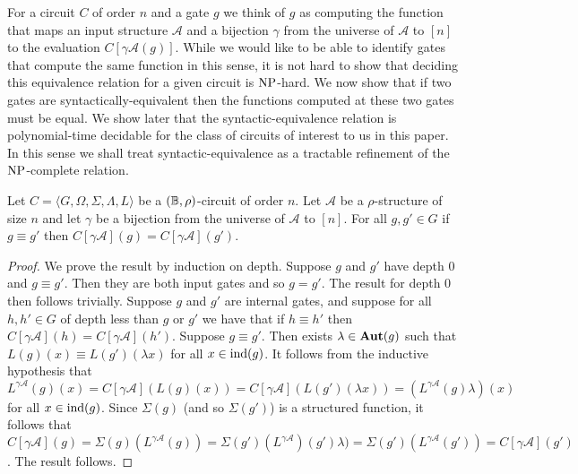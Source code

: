 \documentclass[../paper.tex]{subfiles}
\begin{document}

For a circuit $C$ of order $n$ and a gate $g$ we think of $g$ as computing the
function that maps an input structure $\mathcal{A}$ and a bijection $\gamma$
from the universe of $\mathcal{A}$ to $[n]$ to the evaluation $C[\gamma
\mathcal{A}(g)]$. While we would like to be able to identify gates that compute
the same function in this sense, it is not hard to show that deciding this
equivalence relation for a given circuit is $\mathrm{NP}$-hard. We now show that if two
gates are syntactically-equivalent then the functions computed at these two
gates must be equal. We show later that the syntactic-equivalence relation is
polynomial-time decidable for the class of circuits of interest to us in this
paper. In this sense we shall treat syntactic-equivalence as a tractable
refinement of the $\mathrm{NP}$-complete relation.

\begin{lem}
  Let $C = \langle G, \Omega, \Sigma, \Lambda, L \rangle$ be a $(\mathbb{B},
  \rho)$-circuit of order $n$. Let $\mathcal{A}$ be a $\rho$-structure of size
  $n$ and let $\gamma$ be a bijection from the universe of $\mathcal{A}$ to
  $[n]$. For all $g, g' \in G$ if $g \equiv g'$ then $C[\gamma \mathcal{A}](g) =
  C[\gamma \mathcal{A}](g')$.
  \label{lem:syntactic-equivalence-equal-function}
\end{lem}
\begin{proof}
  We prove the result by induction on depth. Suppose $g$ and $g'$ have depth $0$
  and $g \equiv g'$. Then they are both input gates and so $g = g'$. The result
  for depth $0$ then follows trivially. Suppose $g$ and $g'$ are internal gates,
  and suppose for all $h, h' \in G$ of depth less than $g$ or $g'$ we have that
  if $h \equiv h'$ then $C[\gamma \mathcal{A}](h) = C[\gamma \mathcal{A}](h')$.
  Suppose $g \equiv g'$. Then exists $\lambda \in \text{\textbf{Aut}}(g)$ such that $L(g) (x)
  \equiv L(g') (\lambda x)$ for all $x \in \text{\upshape ind}(g)$. It follows from the
  inductive hypothesis that $L^{\gamma \mathcal{A}}(g)(x) = C[\gamma
  \mathcal{A}](L(g)(x)) = C[\gamma \mathcal{A}](L(g')(\lambda x)) = (L^{\gamma
    \mathcal{A}}(g) \lambda) (x)$ for all $x \in \text{\upshape ind}(g)$. Since $\Sigma(g)$
  (and so $\Sigma(g')$) is a structured function, it follows that $C[\gamma
  \mathcal{A}](g) = \Sigma(g)(L^{\gamma \mathcal{A}} (g)) = \Sigma(g')
  (L^{\gamma \mathcal{A}})(g') \lambda) = \Sigma(g') (L^{\gamma
    \mathcal{A}}(g')) = C[\gamma \mathcal{A}](g')$. The result follows.
\end{proof}
\end{document}
